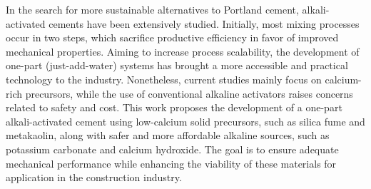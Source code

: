 In the search for more sustainable alternatives to Portland cement, alkali-activated cements have been extensively studied.
Initially, most mixing processes occur in two steps, which sacrifice productive efficiency in favor of improved mechanical properties.
Aiming to increase process scalability, the development of one-part (just-add-water) systems has brought a more accessible and practical technology to the industry.
Nonetheless, current studies mainly focus on calcium-rich precursors, while the use of conventional alkaline activators raises concerns related to safety and cost.
This work proposes the development of a one-part alkali-activated cement using low-calcium solid precursors, such as silica fume and metakaolin, along with safer and more affordable alkaline sources, such as potassium carbonate and calcium hydroxide.
The goal is to ensure adequate mechanical performance while enhancing the viability of these materials for application in the construction industry.